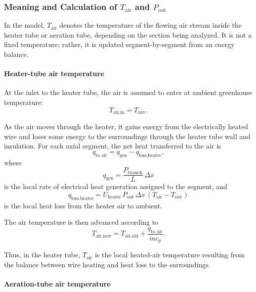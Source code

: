 \documentclass{article}
\begin{document}
\subsubsection{Meaning and Calculation of $T_{\text{air}}$ and $P_{\text{out}}$}

In the model, $T_{\text{air}}$ denotes the temperature of the flowing air
stream inside the heater tube or aeration tube, depending on the section
being analyzed. It is not a fixed temperature; rather, it is updated
segment-by-segment from an energy balance.

\paragraph{Heater-tube air temperature}

At the inlet to the heater tube, the air is assumed to enter at ambient
greenhouse temperature:
\begin{equation}
T_{\text{air,in}} = T_{\text{env}}.
\end{equation}

As the air moves through the heater, it gains energy from the electrically
heated wire and loses some energy to the surroundings through the heater tube
wall and insulation. For each axial segment, the net heat transferred to the
air is
\begin{equation}
q_{\text{to air}} = q_{\text{gen}} - q_{\text{loss,heater}},
\end{equation}
where
\begin{equation}
q_{\text{gen}} = \frac{P_{\text{branch}}}{L}\,\Delta x
\end{equation}
is the local rate of electrical heat generation assigned to the segment, and
\begin{equation}
q_{\text{loss,heater}} =
U_{\text{heater}}\,P_{\text{out}}\,\Delta x\,
\left(T_{\text{air}}-T_{\text{env}}\right)
\end{equation}
is the local heat loss from the heater air to ambient.

The air temperature is then advanced according to
\begin{equation}
T_{\text{air,new}}
=
T_{\text{air,old}}
+
\frac{q_{\text{to air}}}{\dot m c_p}.
\end{equation}

Thus, in the heater tube, $T_{\text{air}}$ is the local heated-air
temperature resulting from the balance between wire heating and heat loss to
the surroundings.

\paragraph{Aeration-tube air temperature}
\end{document}
